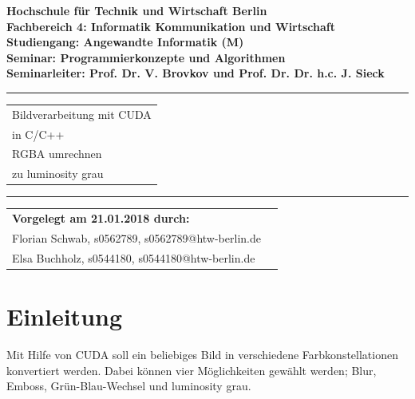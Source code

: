 \documentclass{llncs}
\begin{document}
	\lstset{language=c++, breaklines=true, frame=single}
\thispagestyle{empty}
\begin{flushleft}
\bfseries	Hochschule für Technik und Wirtschaft Berlin\\
	Fachbereich 4: Informatik Kommunikation und Wirtschaft \\
	Studiengang: Angewandte Informatik (M)\\
	Seminar: Programmierkonzepte und Algorithmen\\
	Seminarleiter: Prof. Dr. V. Brovkov und Prof. Dr. Dr. h.c. J. Sieck\\ [2.5cm]
\end{flushleft}
\vspace{45pt}
\rule{\textwidth}{1pt}
\vspace{2pt}
\begin{flushright}
\Huge
\begin{tabular}{@{}l}
Bildverarbeitung mit CUDA\\ in C/C++\\
RGBA umrechnen\\ zu luminosity grau\\[6pt]

\end{tabular}
\end{flushright}
\rule{\textwidth}{1pt}
\vfill

\begin{flushleft}
\begin{tabular}{ll}
{\bfseries Vorgelegt am 21.01.2018 durch: }\\
Florian Schwab, s0562789, s0562789@htw-berlin.de \\
Elsa Buchholz, s0544180, s0544180@htw-berlin.de \\
\end{tabular}
\end{flushleft}

%
\newpage
\tableofcontents
\newpage
%
\section{Einleitung}
%
Mit Hilfe von CUDA soll ein beliebiges Bild in verschiedene Farbkonstellationen konvertiert werden. Dabei können vier  Möglichkeiten gewählt werden; Blur, Emboss, Grün-Blau-Wechsel und luminosity grau.\\
\end{document}
